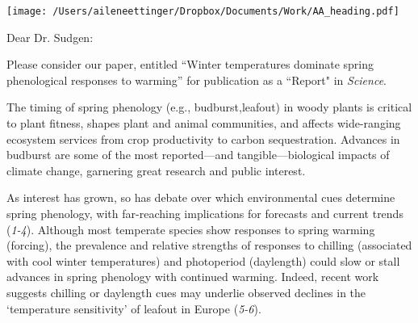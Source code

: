 \documentclass[10.5pt,a4paper]{letter}
\begin{document}

\begin{letter}{}
\texttt{[image: /Users/aileneettinger/Dropbox/Documents/Work/AA\_heading.pdf]}

\opening{Dear Dr. Sudgen:}
Please consider our paper, entitled ``Winter temperatures dominate spring phenological responses to warming'' for publication as a ``Report" in \emph{Science}. 

The timing of spring phenology (e.g., budburst,leafout) in woody plants is critical to plant fitness, shapes plant and animal communities, and affects wide-ranging ecosystem services from crop productivity to carbon sequestration. 
Advances in budburst are some of the most reported---and tangible---biological impacts of climate change, garnering great research and public interest. 

\par As interest has grown, so has debate over which environmental cues determine spring phenology, with far-reaching implications for forecasts and current trends  (\emph{1-4}). Although most temperate species show responses to spring warming (forcing), the prevalence and relative strengths of responses to chilling (associated with cool winter temperatures) and photoperiod (daylength) could slow or stall advances in spring phenology with continued warming. Indeed, recent work suggests chilling or daylength cues may underlie observed declines in the `temperature sensitivity' of leafout in Europe (\emph{5-6}). 


\end{letter}
\end{document}
